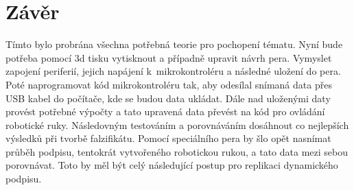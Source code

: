 \chapter{Závěr}
Tímto bylo probrána všechna potřebná teorie pro pochopení tématu.
Nyní bude potřeba pomocí 3d tisku vytisknout a případně upravit návrh pera.
Vymyslet zapojení periferií, jejich napájení k~mikrokontroléru a následné uložení do pera.
Poté naprogramovat kód mikrokontroléru tak, aby odesílal snímaná data přes USB kabel do počítače, kde se budou data ukládat.
Dále nad uloženými daty provést potřebné výpočty a tato upravená data převést na kód pro ovládání robotické ruky.
Následovným testováním a porovnáváním dosáhnout co nejlepších výsledků při tvorbě falzifikátu.
Pomocí speciálního pera by šlo opět nasnímat průběh podpisu, tentokrát vytvořeného robotickou rukou, a tato data mezi sebou porovnávat.
Toto by měl být celý následující postup pro replikaci dynamického podpisu.




